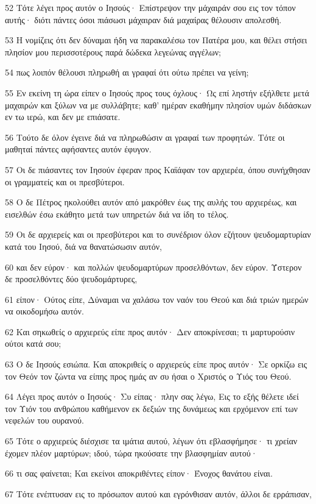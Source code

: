 \par 52 Τότε λέγει προς αυτόν ο Ιησούς· Επίστρεψον την μάχαιράν σου εις τον τόπον αυτής· διότι πάντες όσοι πιάσωσι μάχαιραν διά μαχαίρας θέλουσιν απολεσθή.
\par 53 Η νομίζεις ότι δεν δύναμαι ήδη να παρακαλέσω τον Πατέρα μου, και θέλει στήσει πλησίον μου περισσοτέρους παρά δώδεκα λεγεώνας αγγέλων;
\par 54 πως λοιπόν θέλουσι πληρωθή αι γραφαί ότι ούτω πρέπει να γείνη;
\par 55 Εν εκείνη τη ώρα είπεν ο Ιησούς προς τους όχλους· Ως επί ληστήν εξήλθετε μετά μαχαιρών και ξύλων να με συλλάβητε; καθ' ημέραν εκαθήμην πλησίον υμών διδάσκων εν τω ιερώ, και δεν με επιάσατε.
\par 56 Τούτο δε όλον έγεινε διά να πληρωθώσιν αι γραφαί των προφητών. Τότε οι μαθηταί πάντες αφήσαντες αυτόν έφυγον.
\par 57 Οι δε πιάσαντες τον Ιησούν έφεραν προς Καϊάφαν τον αρχιερέα, όπου συνήχθησαν οι γραμματείς και οι πρεσβύτεροι.
\par 58 Ο δε Πέτρος ηκολούθει αυτόν από μακρόθεν έως της αυλής του αρχιερέως, και εισελθών έσω εκάθητο μετά των υπηρετών διά να ίδη το τέλος.
\par 59 Οι δε αρχιερείς και οι πρεσβύτεροι και το συνέδριον όλον εζήτουν ψευδομαρτυρίαν κατά του Ιησού, διά να θανατώσωσιν αυτόν,
\par 60 και δεν εύρον· και πολλών ψευδομαρτύρων προσελθόντων, δεν εύρον. Ύστερον δε προσελθόντες δύο ψευδομάρτυρες,
\par 61 είπον· Ούτος είπε, Δύναμαι να χαλάσω τον ναόν του Θεού και διά τριών ημερών να οικοδομήσω αυτόν.
\par 62 Και σηκωθείς ο αρχιερεύς είπε προς αυτόν· Δεν αποκρίνεσαι; τι μαρτυρούσιν ούτοι κατά σου;
\par 63 Ο δε Ιησούς εσιώπα. Και αποκριθείς ο αρχιερεύς είπε προς αυτόν· Σε ορκίζω εις τον Θεόν τον ζώντα να είπης προς ημάς αν συ ήσαι ο Χριστός ο Υιός του Θεού.
\par 64 Λέγει προς αυτόν ο Ιησούς· Συ είπας· πλην σας λέγω, Εις το εξής θέλετε ιδεί τον Υιόν του ανθρώπου καθήμενον εκ δεξιών της δυνάμεως και ερχόμενον επί των νεφελών του ουρανού.
\par 65 Τότε ο αρχιερεύς διέσχισε τα ιμάτια αυτού, λέγων ότι εβλασφήμησε· τι χρείαν έχομεν πλέον μαρτύρων; ιδού, τώρα ηκούσατε την βλασφημίαν αυτού·
\par 66 τι σας φαίνεται; Και εκείνοι αποκριθέντες είπον· Ένοχος θανάτου είναι.
\par 67 Τότε ενέπτυσαν εις το πρόσωπον αυτού και εγρόνθισαν αυτόν, άλλοι δε ερράπισαν,

